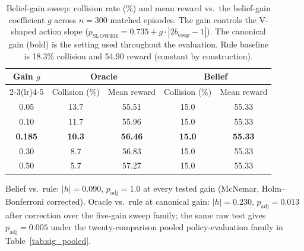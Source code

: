 \begin{table}[htbp]
\centering
\caption{Belief-gain sweep: collision rate (\%) and mean reward vs.\ the
  belief-gain coefficient $g$ across $n{=}300$ matched episodes.
  The gain controls the V-shaped action slope
  ($p_\text{SLOWER}{=}0.735+g\cdot|2b_\text{coop}{-}1|$).
  The canonical gain (bold) is the setting used throughout the evaluation.
  Rule baseline is 18.3\% collision and 54.90 reward (constant by construction).}
\label{tab:gain_sweep}
\small
\begin{tabular}{ccccc}
\toprule
\multirow{2}{*}{\textbf{Gain $g$}} &
\multicolumn{2}{c}{\textbf{Oracle}} &
\multicolumn{2}{c}{\textbf{Belief}} \\
\cmidrule(lr){2-3}\cmidrule(lr){4-5}
& Collision (\%) & Mean reward & Collision (\%) & Mean reward \\
\midrule
0.05  & 13.7 & 55.51 & 15.0 & 55.33 \\
0.10  & 11.7 & 55.96 & 15.0 & 55.33 \\
\textbf{0.185} & \textbf{10.3} & \textbf{56.46} & \textbf{15.0} & \textbf{55.33} \\
0.30  &  8.7 & 56.83 & 15.0 & 55.33 \\
0.50  &  5.7 & 57.27 & 15.0 & 55.33 \\
\bottomrule
\end{tabular}
\begin{tablenotes}
\small
\item Belief vs.\ rule: $|h|{=}0.090$, $p_\text{adj}{=}1.0$ at every tested
  gain (McNemar, Holm--Bonferroni corrected). Oracle vs.\ rule at canonical
  gain: $|h|{=}0.230$, $p_\text{adj}{=}0.013$ after correction over the
  five-gain sweep family; the same raw test gives $p_\text{adj}{=}0.005$
  under the twenty-comparison pooled policy-evaluation family in
  Table~\ref{tab:sig_pooled}.
\end{tablenotes}
\end{table}
